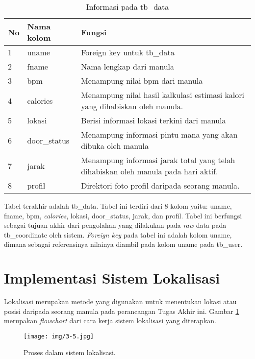 \begin{table}[]
	\caption{Informasi pada tb\_data}
	\label{tab:tb_data}
	\begin{tabular}{|l|l|p{5cm}|}
		\hline
		\textbf{No} & \textbf{Nama kolom} & \textbf{Fungsi} \\ \hline
		1 & uname & Foreign key untuk tb\_data \\ \hline
		2 & fname & Nama lengkap dari manula \\ \hline
		3 & bpm & Menampung nilai bpm dari manula \\ \hline
		4 & calories & Menampung nilai hasil kalkulasi estimasi kalori yang dihabiskan oleh manula. \\ \hline
		5 & lokasi & Berisi informasi lokasi terkini dari manula \\ \hline
		6 & door\_status & Menampung informasi pintu mana yang akan dibuka oleh manula \\ \hline
		7 & jarak & Menampung informasi jarak total yang telah dihabiskan oleh manula pada hari aktif. \\ \hline
		8 & profil & Direktori foto profil daripada seorang manula. \\ \hline
	\end{tabular}
\end{table}
Tabel terakhir adalah tb\_data. Tabel ini terdiri dari 8 kolom yaitu: uname, fname, bpm, \textit{calories}, lokasi, door\_status, jarak, dan profil. Tabel ini berfungsi sebagai tujuan akhir dari pengolahan yang dilakukan pada \textit{raw} data pada tb\_coordinate oleh sistem. \textit{Foreign key} pada tabel ini adalah kolom uname, dimana sebagai referensinya nilainya diambil pada kolom uname pada tb\_user.

\vspace{1ex}
\section{Implementasi Sistem Lokalisasi}
\vspace{1ex}

Lokalisasi merupakan metode yang digunakan untuk menentukan lokasi atau posisi daripada seorang manula pada perancangan Tugas Akhir ini. Gambar \ref{fig:3_5} merupakan \textit{flowchart} dari cara kerja sistem lokalisasi yang diterapkan.
\begin{figure} [!htb]
	\captionsetup{justification=centering}
	\texttt{[image: img/3-5.jpg]}
	\caption{Proses dalam sistem lokalisasi.}
	\label{fig:3_5}
\end{figure}

